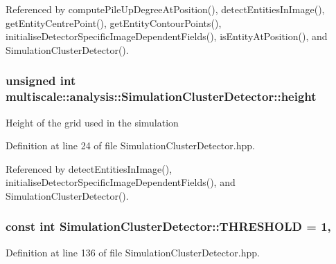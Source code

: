 Referenced by compute\-Pile\-Up\-Degree\-At\-Position(), detect\-Entities\-In\-Image(), get\-Entity\-Centre\-Point(), get\-Entity\-Contour\-Points(), initialise\-Detector\-Specific\-Image\-Dependent\-Fields(), is\-Entity\-At\-Position(), and Simulation\-Cluster\-Detector().

\hypertarget{classmultiscale_1_1analysis_1_1SimulationClusterDetector_a9d0a0fe5d9ea0f2516d07bf44b1da257}{
\subsubsection[{height}]{\setlength{\rightskip}{0pt plus 5cm}unsigned int multiscale\-::analysis\-::\-Simulation\-Cluster\-Detector\-::height\hspace{0.3cm}{\ttfamily [private]}}}\label{classmultiscale_1_1analysis_1_1SimulationClusterDetector_a9d0a0fe5d9ea0f2516d07bf44b1da257}
Height of the grid used in the simulation 

Definition at line 24 of file Simulation\-Cluster\-Detector.\-hpp.



Referenced by detect\-Entities\-In\-Image(), initialise\-Detector\-Specific\-Image\-Dependent\-Fields(), and Simulation\-Cluster\-Detector().

\hypertarget{classmultiscale_1_1analysis_1_1SimulationClusterDetector_a460525b4359afb52b4bde2ebd600122c}{
\subsubsection[{T\-H\-R\-E\-S\-H\-O\-L\-D}]{\setlength{\rightskip}{0pt plus 5cm}const int Simulation\-Cluster\-Detector\-::\-T\-H\-R\-E\-S\-H\-O\-L\-D = 1\hspace{0.3cm}{\ttfamily [static]}, {\ttfamily [private]}}}\label{classmultiscale_1_1analysis_1_1SimulationClusterDetector_a460525b4359afb52b4bde2ebd600122c}


Definition at line 136 of file Simulation\-Cluster\-Detector.\-hpp.



